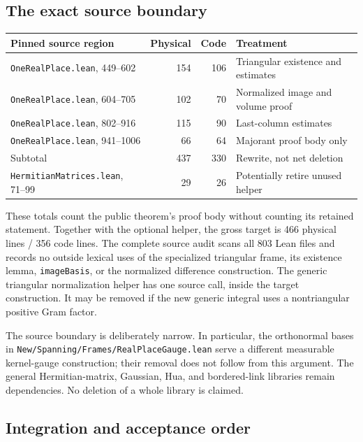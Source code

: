 \documentclass[11pt,letterpaper]{article}
\theoremstyle{remark}
\newcommand{\code}[1]{{\small\urlstyle{tt}\nolinkurl{#1}}}
\begin{document}
\subsection{The exact source boundary}

\begin{center}\small
\begin{tabular}{p{2.5in}rrp{1.45in}}
\toprule
Pinned source region & Physical & Code & Treatment\\
\midrule
\code{OneRealPlace.lean}, 449--602 &154&106&Triangular existence and estimates\\
\code{OneRealPlace.lean}, 604--705 &102&70&Normalized image and volume proof\\
\code{OneRealPlace.lean}, 802--916 &115&90&Last-column estimates\\
\code{OneRealPlace.lean}, 941--1006 &66&64&Majorant proof body only\\
\midrule
Subtotal &437&330&Rewrite, not net deletion\\
\code{HermitianMatrices.lean}, 71--99 &29&26&Potentially retire unused helper\\
\bottomrule
\end{tabular}
\end{center}

These totals count the public theorem's proof body without counting its retained
statement. Together with the optional helper, the gross target is 466 physical
lines / 356 code lines. The complete source audit scans all 803 Lean files and
records no outside lexical uses of
the specialized triangular frame, its existence lemma, \code{imageBasis}, or
the normalized difference construction. The generic triangular normalization
helper has one source call, inside the target construction. It may be removed
if the new generic integral uses a nontriangular positive Gram factor.

The source boundary is deliberately narrow. In particular, the orthonormal bases
in \code{New/Spanning/Frames/RealPlaceGauge.lean} serve a different measurable
kernel-gauge construction; their removal does not follow from this argument.
The general Hermitian-matrix, Gaussian, Hua, and bordered-link libraries remain
dependencies. No deletion of a whole library is claimed.

\subsection{Integration and acceptance order}
\end{document}
